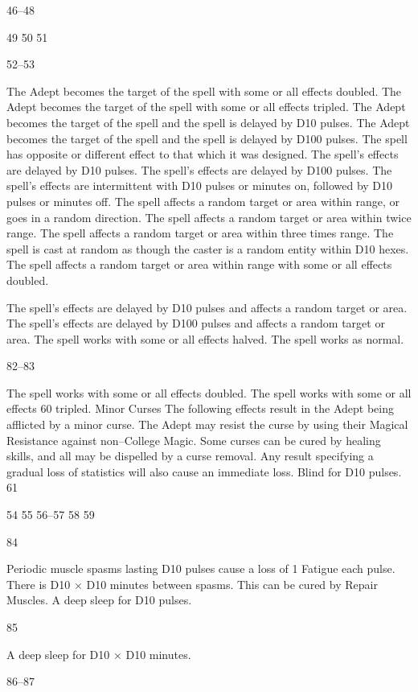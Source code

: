 \documentclass[a4paper]{article}
\begin{document}
\begin{multicols}{3}
46–48

49
50
51

52–53

The Adept becomes the target of the spell
with some or all effects doubled.
The Adept becomes the target of the spell
with some or all effects tripled.
The Adept becomes the target of the spell
and the spell is delayed by D10 pulses.
The Adept becomes the target of the spell
and the spell is delayed by D100 pulses.
The spell has opposite or different effect
to that which it was designed.
The spell’s effects are delayed by D10
pulses.
The spell’s effects are delayed by D100
pulses.
The spell’s effects are intermittent with
D10 pulses or minutes on, followed by
D10 pulses or minutes off.
The spell affects a random target or area
within range, or goes in a random direction.
The spell affects a random target or area
within twice range.
The spell affects a random target or area
within three times range.
The spell is cast at random as though the
caster is a random entity within D10
hexes.
The spell affects a random target or area
within range with some or all effects
doubled.

The spell’s effects are delayed by D10
pulses and affects a random target or area.
The spell’s effects are delayed by D100
pulses and affects a random target or area.
The spell works with some or all effects
halved.
The spell works as normal.

82–83

The spell works with some or all effects
doubled.
The spell works with some or all effects
60
tripled.
Minor Curses The following effects result in the
Adept being afflicted by a minor curse. The Adept
may resist the curse by using their Magical Resistance against non–College Magic. Some curses can
be cured by healing skills, and all may be dispelled
by a curse removal. Any result specifying a gradual
loss of statistics will also cause an immediate loss.
Blind for D10 pulses.
61

54
55
56–57
58
59

84

Periodic muscle spasms lasting D10
pulses cause a loss of 1 Fatigue each
pulse. There is D10 × D10 minutes between spasms. This can be cured by Repair Muscles.
A deep sleep for D10 pulses.

85

A deep sleep for D10 × D10 minutes.

86–87


\end{multicols}
\end{document}
